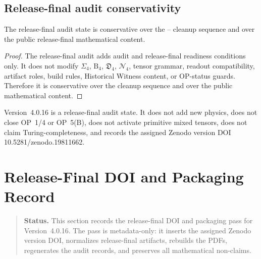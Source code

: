 \subsection{Release-final audit conservativity}
\label{subsec:v4016-release-final-conservativity}

\begin{theorem}
\label{thm:v4016-final-local-audit-release-final-conservativity}
The  release-final audit state is conservative over
the -- cleanup sequence and over the public  release-final
mathematical content.
\end{theorem}

\begin{proof}
The release-final audit adds audit and release-final readiness conditions only. It does
not modify $\Sigma_4$, $\mathrm B_4$, $\mathfrak D_4$, $\mathcal N_4$, tensor
grammar, readout compatibility, artifact roles, build rules, Historical Witness
content, or OP-status guards. Therefore it is conservative over the cleanup
sequence and over the public  mathematical content.
\end{proof}

\begin{remark}
\label{rem:v4016-non-claim}
Version~4.0.16 is a release-final audit state. It
does not add new physics, does not close OP~1/4 or OP~5(B), does not activate
primitive mixed tensors, does not claim Turing-completeness, and records the assigned Zenodo version DOI 10.5281/zenodo.19811662.
\end{remark}



\clearpage
\section{ Release-Final DOI and Packaging Record}
\label{sec:v4016-release-final-doi-packaging-record}

\begin{quote}\small
\noindent\textbf{Status.}
This section records the release-final DOI and packaging pass for
Version~4.0.16. The pass is metadata-only: it inserts the assigned Zenodo
version DOI, normalizes release-final artifacts, rebuilds the PDFs, regenerates
the audit records, and preserves all mathematical non-claims.
\end{quote}

